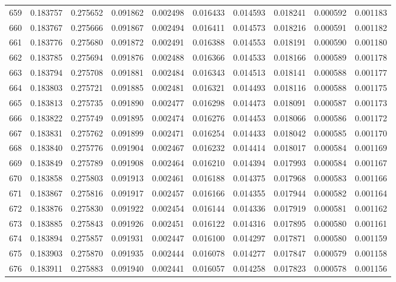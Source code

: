 \begin{tabular}{lrrrrrrrrr}
659 & 0.183757 & 0.275652 & 0.091862 & 0.002498 & 0.016433 & 0.014593 & 0.018241 & 0.000592 & 0.001183 \\
660 & 0.183767 & 0.275666 & 0.091867 & 0.002494 & 0.016411 & 0.014573 & 0.018216 & 0.000591 & 0.001182 \\
661 & 0.183776 & 0.275680 & 0.091872 & 0.002491 & 0.016388 & 0.014553 & 0.018191 & 0.000590 & 0.001180 \\
662 & 0.183785 & 0.275694 & 0.091876 & 0.002488 & 0.016366 & 0.014533 & 0.018166 & 0.000589 & 0.001178 \\
663 & 0.183794 & 0.275708 & 0.091881 & 0.002484 & 0.016343 & 0.014513 & 0.018141 & 0.000588 & 0.001177 \\
664 & 0.183803 & 0.275721 & 0.091885 & 0.002481 & 0.016321 & 0.014493 & 0.018116 & 0.000588 & 0.001175 \\
665 & 0.183813 & 0.275735 & 0.091890 & 0.002477 & 0.016298 & 0.014473 & 0.018091 & 0.000587 & 0.001173 \\
666 & 0.183822 & 0.275749 & 0.091895 & 0.002474 & 0.016276 & 0.014453 & 0.018066 & 0.000586 & 0.001172 \\
667 & 0.183831 & 0.275762 & 0.091899 & 0.002471 & 0.016254 & 0.014433 & 0.018042 & 0.000585 & 0.001170 \\
668 & 0.183840 & 0.275776 & 0.091904 & 0.002467 & 0.016232 & 0.014414 & 0.018017 & 0.000584 & 0.001169 \\
669 & 0.183849 & 0.275789 & 0.091908 & 0.002464 & 0.016210 & 0.014394 & 0.017993 & 0.000584 & 0.001167 \\
670 & 0.183858 & 0.275803 & 0.091913 & 0.002461 & 0.016188 & 0.014375 & 0.017968 & 0.000583 & 0.001166 \\
671 & 0.183867 & 0.275816 & 0.091917 & 0.002457 & 0.016166 & 0.014355 & 0.017944 & 0.000582 & 0.001164 \\
672 & 0.183876 & 0.275830 & 0.091922 & 0.002454 & 0.016144 & 0.014336 & 0.017919 & 0.000581 & 0.001162 \\
673 & 0.183885 & 0.275843 & 0.091926 & 0.002451 & 0.016122 & 0.014316 & 0.017895 & 0.000580 & 0.001161 \\
674 & 0.183894 & 0.275857 & 0.091931 & 0.002447 & 0.016100 & 0.014297 & 0.017871 & 0.000580 & 0.001159 \\
675 & 0.183903 & 0.275870 & 0.091935 & 0.002444 & 0.016078 & 0.014277 & 0.017847 & 0.000579 & 0.001158 \\
676 & 0.183911 & 0.275883 & 0.091940 & 0.002441 & 0.016057 & 0.014258 & 0.017823 & 0.000578 & 0.001156 \\

\end{tabular}
